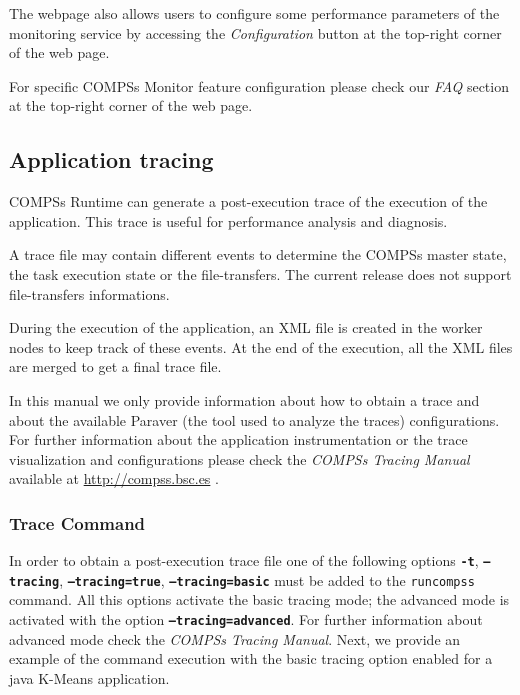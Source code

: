 
The webpage also allows users to configure some performance parameters of the monitoring service by accessing the 
\textit{Configuration} button at the top-right corner of the web page. 

For specific COMPSs Monitor feature configuration please check our \textit{FAQ} section at the top-right corner of the web page. 


\subsection{Application tracing}
\label{sec:Tracing}
COMPSs Runtime can generate a post-execution trace of the execution of the application. This trace is useful for
performance analysis and diagnosis.

A trace file may contain different events to determine the COMPSs master state, the task execution state or the file-transfers.
The current release does not support file-transfers informations.

During the execution of the application, an XML file is created in the worker nodes to keep track of 
these events. At the end of the execution, all the XML files are merged to get a final trace file.

In this manual we only provide information about how to obtain a trace and about the available Paraver (the tool used to analyze the traces) configurations. For further
information about the application instrumentation or the trace visualization and configurations please check the \textit{COMPSs Tracing Manual} 
available at \url{http://compss.bsc.es} .

\subsubsection{Trace Command}


In order to obtain a post-execution trace file one of the following options \texttt{\textbf{-t}}, \texttt{\textbf{--tracing}}, \texttt{\textbf{--tracing=true}}, \texttt{\textbf{--tracing=basic}} 
must be added to the \texttt{runcompss} command. All this options activate the basic tracing mode; the advanced mode is activated with the 
option \texttt{\textbf{--tracing=advanced}}. For further information about advanced mode check the \textit{COMPSs Tracing Manual}. Next, we
provide an example of the command execution with the basic tracing option enabled for a java K-Means application.

